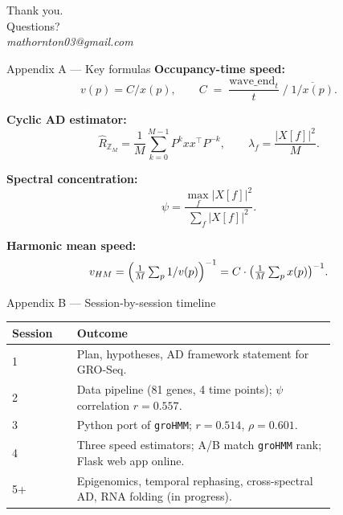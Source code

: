 \documentclass[aspectratio=169,10pt]{beamer}
\begin{document}
\begin{frame}[standout]
Thank you.\\[0.5em]
{\Large Questions?}\\[1em]
{\small\itshape mathornton03@gmail.com}
\end{frame}

\appendix

\begin{frame}{Appendix A --- Key formulas}
\small
\textbf{Occupancy-time speed:}
\[
  v(p) = C / x(p), \qquad
  C \;=\; \frac{\text{wave\_end}_t}{t}\;\Big/\;\overline{1/x(p)}.
\]

\textbf{Cyclic AD estimator:}
\[
  \hat{R}_{\mathbb{Z}_M} = \frac{1}{M}\sum_{k=0}^{M-1} P^k xx^\top P^{-k},
  \qquad
  \lambda_f = \frac{|X[f]|^2}{M}.
\]

\textbf{Spectral concentration:}
\[
  \psi = \frac{\max_f |X[f]|^2}{\sum_f |X[f]|^2}.
\]

\textbf{Harmonic mean speed:}
\[
  v_{HM} = \Bigl(\tfrac{1}{M}\textstyle\sum_p 1/v(p)\Bigr)^{-1}
  = C \cdot \bigl(\tfrac{1}{M}\sum_p x(p)\bigr)^{-1}.
\]
\end{frame}

\begin{frame}{Appendix B --- Session-by-session timeline}
\small
\begin{tabular}{@{}lp{0.8\linewidth}@{}}
\toprule
Session & Outcome \\
\midrule
1 & Plan, hypotheses, AD framework statement for GRO-Seq.\\
2 & Data pipeline (81 genes, 4 time points); $\psi$ correlation $r=0.557$.\\
3 & Python port of \texttt{groHMM}; $r = 0.514$, $\rho = 0.601$.\\
4 & Three speed estimators; A/B match \texttt{groHMM} rank;
    Flask web app online.\\
5+ & Epigenomics, temporal rephasing, cross-spectral AD,
    RNA folding (in progress).\\
\bottomrule
\end{tabular}
\end{frame}
\end{document}
